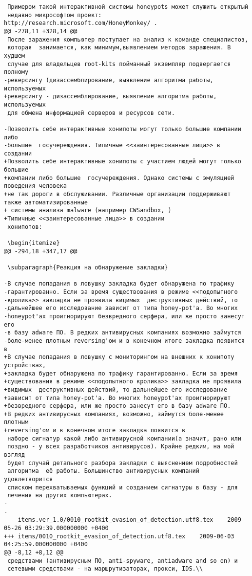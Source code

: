 \begin{verbatim}
 Примером такой интерактивной системы honeypots может служить открытый
 недавно микрософтом проект: http://research.microsoft.com/HoneyMonkey/ .
@@ -278,11 +328,14 @@
 После заражения компьютер поступает на анализ к команде специалистов,
 которая  занимается, как минимум,выявлением методов заражения. В худшем
 случае для владельцев root-kits пойманный экземпляр подвергается полному
-реверсингу (дизассемблирование, выявление алгоритма работы, используемых
+реверсингу - дизассемблирование, выявление алгоритма работы, используемых
 для обмена информацией серверов и ресурсов сети.

-Позволить себе интерактивные хонипоты могут только большие компании либо
-большие  госучереждения. Типичные <<заинтересованные лица>> в создании
+Позволить себе интерактивные хонипоты с участием людей могут только большие
+компании либо большие  госучереждения. Однако системы с эмуляцией поведения человека
+не так дороги в обслуживании. Различные организации поддерживают также автоматизированные
+ системы анализа malware (например CWSandbox, )
+Типичные <<заинтересованные лица>> в создании
 хонипотов:

 \begin{itemize}
@@ -294,18 +347,17 @@

 \subparagraph{Реакция на обнаружение закладки}

-В случае попадания в ловушку закладка будет обнаружена по трафику
-гарантированно. Если за время существования в режиме <<подопытного
-кролика>> закладка не проявила видимых  деструктивных действий, то
-дальнейшее его исследование зависит от типа honey-pot'а. Во многих
-honeypot'ах проигнорируют безвредного серфера, или же просто занесут его
-в базу adware ПО. В редких антивирусных компаниях возможно займутся
-боле-менее плотным reversing'ом и в конечном итоге закладка появится в
+В случае попадания в ловушку с мониторингом на внешних к хонипоту устройствах,
+закладка будет обнаружена по трафику гарантированно. Если за время
+существования в режиме <<подопытного кролика>> закладка не проявила
+видимых  деструктивных действий, то дальнейшее его исследование
+зависит от типа honey-pot'а. Во многих honeypot'ах проигнорируют
+безвредного серфера, или же просто занесут его в базу adware ПО.
+В редких антивирусных компаниях, возможно, займутся боле-менее плотным
+reversing'ом и в конечном итоге закладка появится в
 наборе сигнатур какой либо антивирусной компании(а значит, рано или
 поздно - у всех разработчиков антивирусов). Крайне редким, на мой взгляд
 будет случай детального разбора закладки с выяснением подробностей
 алгоритма  её работы. Большинство антивирусных компаний удовлетворится
 списком перехватываемых функций и созданием сигнатуры в базу - для
 лечения на других компьютерах.
-
-
--- items.ver_1.0/0010_rootkit_evasion_of_detection.utf8.tex	2009-05-26 03:29:39.000000000 +0400
+++ items/0010_rootkit_evasion_of_detection.utf8.tex	2009-06-03 04:25:59.000000000 +0400
@@ -8,12 +8,12 @@
 средствами (антивирусным ПО, anti-spyware, antiadware and so on) и
 сетевыми средствами - на маршрутизаторах, прокси, IDS.\\


\end{verbatim}
